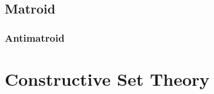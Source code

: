 \subsection{Matroid}\label{sec:matroid}

\subsubsection{Antimatroid}\label{sec:antimatroid}



\section{Constructive Set Theory}\label{sec:constructive_set_theory}
